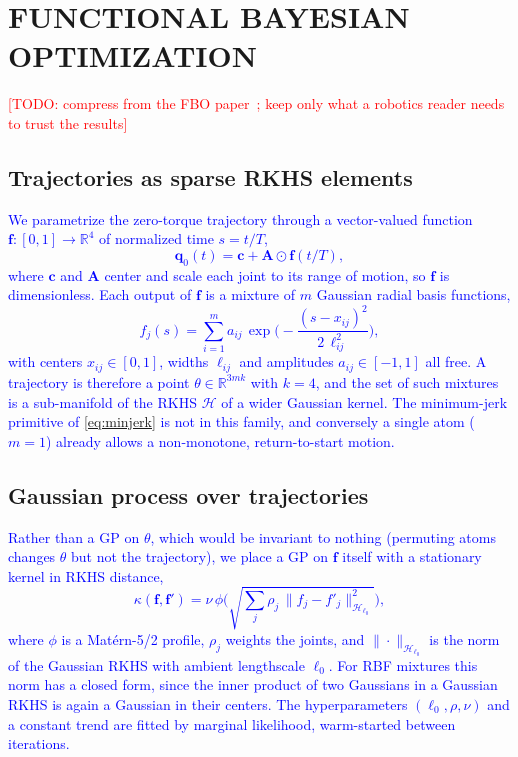 \documentclass[letterpaper, 10 pt, conference]{ieeeconf}
\newcommand{\todo}[1]{\textcolor{red}{[TODO: #1]}}
\newcommand{\draft}[1]{\textcolor{blue}{#1}}
\newcommand{\R}{\mathbb{R}}
\newcommand{\Hs}{\mathcal{H}}
\newcommand{\vq}{\mathbf{q}}
\newcommand{\vf}{\mathbf{f}}
\begin{document}
\section{FUNCTIONAL BAYESIAN OPTIMIZATION}
\label{sec:method}

\todo{compress from the FBO paper~\cite{ours2026fbo}; keep only what a robotics
reader needs to trust the results}

\subsection{Trajectories as sparse RKHS elements}
\draft{
We parametrize the zero-torque trajectory through a vector-valued function
$\vf:[0,1]\to\R^4$ of normalized time $s = t/T$,
\begin{equation}
  \vq_0(t) = \mathbf{c} + \mathbf{A} \odot \vf(t/T),
  \label{eq:reference}
\end{equation}
where $\mathbf{c}$ and $\mathbf{A}$ center and scale each joint to its range
of motion, so $\vf$ is dimensionless. Each output of $\vf$ is a mixture of $m$
Gaussian radial basis functions,
\begin{equation}
  f_j(s) = \sum_{i=1}^{m} a_{ij}\,
  \exp\!\Big(-\frac{(s - x_{ij})^2}{2\,\ell_{ij}^2}\Big),
  \label{eq:mixture}
\end{equation}
with centers $x_{ij}\in[0,1]$, widths $\ell_{ij}$ and amplitudes
$a_{ij}\in[-1,1]$ all free. A trajectory is therefore a point $\theta\in\R^{3mk}$
with $k=4$, and the set of such mixtures is a sub-manifold of the RKHS $\Hs$ of
a wider Gaussian kernel. The minimum-jerk primitive of \eqref{eq:minjerk} is not
in this family, and conversely a single atom ($m=1$) already allows a
non-monotone, return-to-start motion.
}

\subsection{Gaussian process over trajectories}
\draft{
Rather than a GP on $\theta$, which would be invariant to nothing (permuting
atoms changes $\theta$ but not the trajectory), we place a GP on $\vf$ itself
with a stationary kernel in RKHS distance,
\begin{equation}
  \kappa(\vf, \vf') = \nu\,\phi\Big(\sqrt{\textstyle\sum_j \rho_j\,
  \|f_j - f'_j\|_{\Hs_{\ell_0}}^2}\Big),
  \label{eq:kernel}
\end{equation}
where $\phi$ is a Mat\'ern-5/2 profile, $\rho_j$ weights the joints, and
$\|\cdot\|_{\Hs_{\ell_0}}$ is the norm of the Gaussian RKHS with ambient
lengthscale $\ell_0$. For RBF mixtures this norm has a closed form, since the
inner product of two Gaussians in a Gaussian RKHS is again a Gaussian in their
centers. The hyperparameters $(\ell_0, \rho, \nu)$ and a constant trend are
fitted by marginal likelihood, warm-started between iterations.
}
\end{document}
